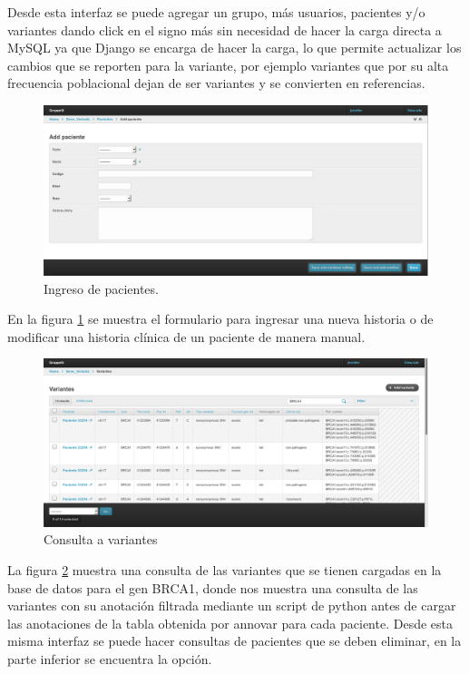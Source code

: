 Desde esta interfaz se puede agregar un grupo, más usuarios, pacientes y/o variantes dando click en el signo más sin necesidad de hacer la carga directa a MySQL ya que Django se encarga de hacer la carga, lo que permite actualizar los cambios que se reporten para la variante, por ejemplo variantes que por su alta frecuencia poblacional dejan de ser variantes y se convierten en referencias. \\

\begin{figure}[h] 
	\centering
	\includegraphics[width=1\textwidth]{Kap3/ingresar_paciente}
	\caption{Ingreso de pacientes.} \label{fig:pacientes}
\end{figure}

En la figura \ref{fig:pacientes} se muestra el formulario para ingresar una nueva historia o de modificar una historia clínica de un paciente de manera manual.\\

\begin{figure}[h] 
	\centering
	\includegraphics[width=1\textwidth]{Kap3/consulta}
	\caption{Consulta a variantes} \label{fig:consulta}
\end{figure}


La figura \ref{fig:consulta} muestra una consulta de las variantes que se tienen cargadas en la base de datos para el gen BRCA1, donde nos muestra una consulta de las variantes con su anotación  filtrada mediante un script de python antes de cargar las anotaciones de la tabla obtenida por annovar para cada paciente. Desde esta misma interfaz se puede hacer consultas de pacientes que se deben eliminar, en la parte inferior se encuentra la opción.\\


